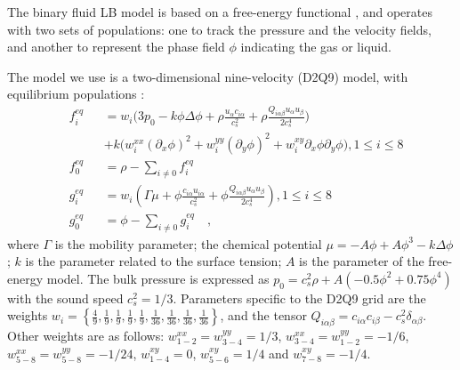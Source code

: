 \documentclass{article}
\begin{document}
The binary fluid LB model is
based on a free-energy functional \cite{swift,landau}, and operates with two
sets of populations: one to track the pressure and the velocity fields, and another to represent the
phase field $\phi$ indicating the gas or liquid.

The model we use is a two-dimensional nine-velocity (D2Q9) model,
with equilibrium populations \cite{pooley-contact}:
\begin{equation}
\label{set:equilibrium:binary}
\begin{aligned}
&f_i^{eq}&&=w_i 
\biggl(3
p_0 - k \phi \Delta \phi
+\rho\frac{u_{\alpha}c_{i\alpha}}{c_s^2}+\rho \frac{Q_{i\alpha\beta}u_{\alpha } u_ {
\beta}}{2 c_s^4}\biggr)\\
&&&+k\bigl(w_i^{xx} (\partial_x \phi)^2+w_i^{yy} (\partial_y \phi)^2 +w_i^{xy} \partial_x
\phi \partial_y \phi \bigr), 1\leq i \leq 8\\
&f_0^{eq}&&=\rho-\sum_{i\neq0}{f_i^{eq}}\\
&g_i^{eq}&&=w_i\left(\Gamma \mu + \phi\frac{ c_{i\alpha} u_{i\alpha}}{c_s^2}+\phi
\frac{Q_{i\alpha\beta}u_{\alpha}u_{\beta}}{2 c_s^4}\right), 1\leq i \leq 8 \\
&g_0^{eq}&&=\phi-\sum_{i\neq0}{g_i^{eq}}\quad,
\end{aligned}
\end{equation}
where $\Gamma$ is the mobility parameter; the chemical potential
$\mu=-A\phi+A\phi^3-k\Delta\phi$; $k$ is the parameter related to the surface
tension; $A$ is the parameter of the free-energy model. The bulk pressure
is expressed as $p_0=c_s^2 \rho +A (-0.5 \phi^2+0.75 \phi^4)$ with
the sound speed $c_s^2=1/3$. 
Parameters specific to the D2Q9 grid are the weights
$w_i=\left\{\frac{4}{9},\frac{1}{9},\frac{1}{9},\frac{1}{9},\frac{1}{9},
\frac{1}{36},\frac{1}{36},\frac{1}{36},\frac{1}{36}\right\}$, and the tensor
$Q_{i\alpha\beta}=c_{i\alpha} c_{i\beta} - c_s^2 \delta_{\alpha\beta}$.  
Other weights 
are as follows:
$w^{xx}_{1-2}=w^{yy}_{3-4}=1/3$, $w^{xx}_{3-4}=w^{yy}_{1-2}=-1/6$,
$w^{xx}_{5-8}=w^{yy}_{5-8}=-1/24$, $w^{xy}_{1-4}=0$, $w^{xy}_{5-6}=1/4$ and
$w^{xy}_{7-8}=-1/4$. 
\end{document}
